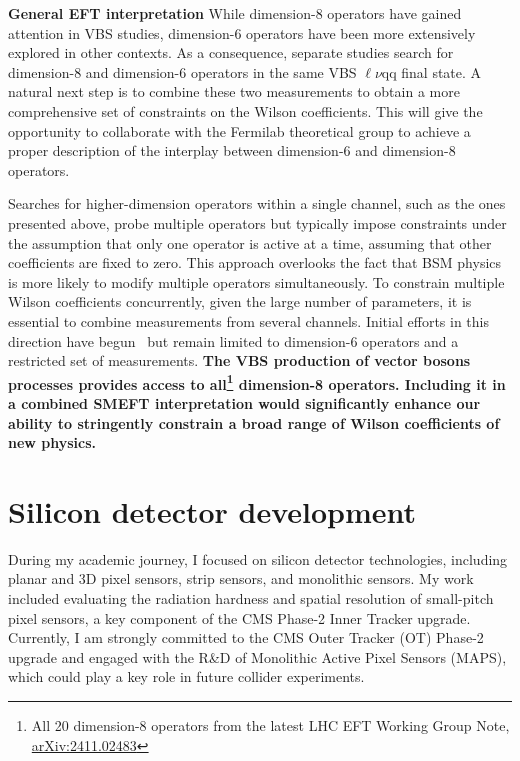 {\begin{flushleft}
\textbf{General EFT interpretation}
While dimension-8 operators have gained attention in VBS studies, dimension-6 operators have been more extensively explored in other contexts. As a consequence, separate studies search for dimension-8 and dimension-6 operators in the same VBS $\ell\nu$qq final state. A natural next step is to combine these two measurements to obtain a more comprehensive set of constraints on the Wilson coefficients. This will give the opportunity to collaborate with the Fermilab theoretical group to achieve a proper description of the interplay between dimension-6 and dimension-8 operators.

Searches for higher-dimension operators within a single channel, such as the ones presented above, probe multiple operators but typically impose constraints under the assumption that only one operator is active at a time, assuming that other coefficients are fixed to zero. This approach overlooks the fact that BSM physics is more likely to modify multiple operators simultaneously. To constrain multiple Wilson coefficients concurrently, given the large number of parameters, it is essential to combine measurements from several channels. Initial efforts in this direction have begun~\cite{[6]} but remain limited to dimension-6 operators and a restricted set of measurements. {\bf The VBS production of vector bosons processes provides access to all\footnote{All 20 dimension-8 operators from the latest LHC EFT Working Group Note, \href{https://arxiv.org/abs/2411.02483v1}{
arXiv:2411.02483}} dimension-8 operators. Including it in a combined SMEFT interpretation would significantly enhance our ability to stringently constrain a broad range of Wilson coefficients of new physics.}



\vskip 10pt
\section{Silicon detector development}
\vskip 5pt
During my academic journey, I focused on silicon detector technologies, including planar and 3D pixel sensors, strip sensors, and monolithic sensors. My work included evaluating the radiation hardness and spatial resolution of small-pitch pixel sensors, a key component of the CMS Phase-2 Inner Tracker upgrade. Currently, I am strongly committed to the CMS Outer Tracker  (OT) Phase-2 upgrade and engaged with the R\&D of Monolithic Active Pixel Sensors (MAPS), which could play a key role in future collider experiments.
\vskip 5pt

\end{flushleft}}
